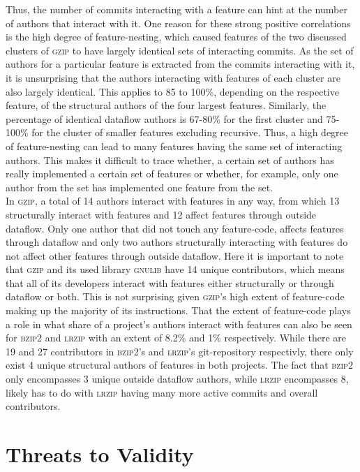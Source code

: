 Thus, the number of commits interacting with a feature can hint at the number of authors that interact with it.
One reason for these strong positive correlations is the high degree of feature-nesting, which caused features of the two discussed clusters of \textsc{gzip} to have largely identical sets of interacting commits.
As the set of authors for a particular feature is extracted from the commits interacting with it, it is unsurprising that the authors interacting with features of each cluster are also largely identical.
This applies to 85 to 100\%, depending on the respective feature, of the structural authors of the four largest features. 
Similarly, the percentage of identical dataflow authors is 67-80\% for the first cluster and 75-100\% for the cluster of smaller features excluding \textsf{recursive}.
Thus, a high degree of feature-nesting can lead to many features having the same set of interacting authors.
This makes it difficult to trace whether, a certain set of authors has really implemented a certain set of features or whether, for example, only one author from the set has implemented one feature from the set. \\
In \textsc{gzip}, a total of 14 authors interact with features in any way, from which 13 structurally interact with features and 12 affect features through outside dataflow.
Only one author that did not touch any feature-code, affects features through dataflow and only two authors structurally interacting with features do not affect other features through outside dataflow.
Here it is important to note that \textsc{gzip} and its used library \textsc{gnulib} have 14 unique contributors, which means that all of its developers interact with features either structurally or through dataflow or both.
This is not surprising given \textsc{gzip}'s high extent of feature-code making up the majority of its instructions.
That the extent of feature-code plays a role in what share of a project's authors interact with features can also be seen for \textsc{bzip2} and \textsc{lrzip} with an extent of 8.2\% and 1\% respectively.
While there are 19 and 27 contributors in \textsc{bzip2}'s and \textsc{lrzip}'s git-repository respectivly, there only exist 4 unique structural authors of features in both projects.
The fact that \textsc{bzip2} only encompasses 3 unique outside dataflow authors, while \textsc{lrzip} encompasses 8, likely has to do with \textsc{lrzip} having many more active commits and overall contributors.

\section{Threats to Validity}\label{sec:threats}

